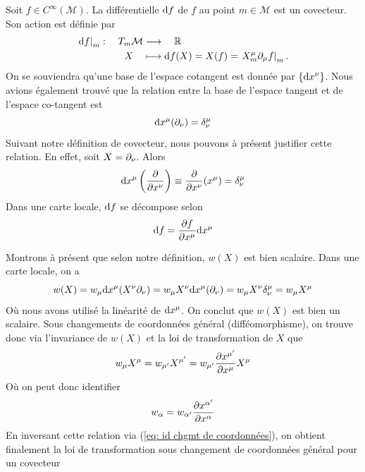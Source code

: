 \begin{exmp}
    Soit $f\in C^\infty(\mathcal{M})$. La différentielle $\mathrm{d} f$ de $f$ au point $m\in \mathcal{M}$ est un covecteur. Son action est définie par
    \begin{align}
        \left. \mathrm{d} f \right|_m : \quad T_m \mathcal{M} &\longrightarrow \quad  \mathbb{R} \\
        X \quad&\longmapsto \mathrm{d} f (X) = X(f) = \left. X^\mu_m \partial_\mu f \right|_m.
    \end{align}
    On se souviendra qu'une base de l'espace cotangent est donnée par $\{ \mathrm{d} x^\nu\}$. Nous avions également trouvé que la relation entre la base de l'espace tangent et de l'espace co-tangent est
    \begin{equation}
        \td  x^\mu (\pd_\nu) = \delta\indices*{^\mu_\nu}
    \end{equation}
    Suivant notre définition de covecteur, nous pouvons à présent justifier cette relation. En effet, soit $X = \partial_\nu$. Alors
    \begin{equation}
        \td x^\mu \lt \frac{\pd}{\pd x^\nu}\rt \equiv \frac{\pd}{\pd x^\nu}(x^\mu) = \delta\indices*{^\mu_\nu}
    \end{equation}
    Dans une carte locale, $\mathrm{d} f$ se décompose selon
    \begin{equation}
        \mathrm{d} f = \frac{\partial f}{\partial x^\mu} \mathrm{d} x^\mu
    \end{equation}
\end{exmp}
\cutebreak
Montrons à présent que selon notre définition, $w(X)$ est bien scalaire. Dans une carte locale, on a
\begin{equation}
    w(X) = w_\mu \td x^\mu (X^\nu \pd_\nu ) = w_\mu X^\nu \td x^\mu (\pd_\nu) = w_\mu X^\nu \delta\indices*{^\mu_\nu} = w_\mu X^\mu
\end{equation}
Où nous avons utilisé la linéarité de $\mathrm{d} x^\mu$. On conclut que $w(X)$ est bien un scalaire. Sous changements de coordonnées général (difféomorphisme), on trouve donc via l'invariance de $w(X)$ et la loi de transformation de $X$ que
\begin{equation}
    w_\mu X^\mu = w_{\mu'} X^{\mu'} = w_{\mu'} \frac{\partial x^{\mu'}}{\partial x^\mu} X^\mu
\end{equation}
Où on peut donc identifier
\begin{equation}
    w_\alpha = w_{\alpha'} \frac{\partial x^{\alpha'}}{\partial x^\alpha}
\end{equation}
En inversant cette relation via (\ref{eq: id chgmt de coordonnées}), on obtient finalement la loi de transformation sous changement de coordonnées général pour un covecteur

